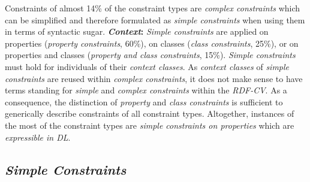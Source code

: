 \documentclass[a4paper,fontsize=11pt]{scrartcl}
\newcommand{\tb}[1]{\todo[size=\small, color=green!40]{\textbf{Thomas:} #1}}
\begin{document}
Constraints of almost 14\% of the constraint types are \emph{complex constraints}
which can be simplified and therefore formulated as \emph{simple constraints} when using them in terms of syntactic sugar.
\textbf{\emph{Context}:}
\emph{Simple constraints} are applied on properties (\emph{property constraints}, 60\%),
on classes (\emph{class constraints}, 25\%), or
on properties and classes (\emph{property and class constraints}, 15\%).
\emph{Simple constraints} must hold for individuals of their \emph{context classes}.
As \emph{context classes} of \emph{simple constraints} are reused within \emph{complex constraints},
it does not make sense to have terms standing for \emph{simple} and \emph{complex constraints} within the \emph{RDF-CV}. 
As a consequence, the distinction of \emph{property} and \emph{class constraints} is sufficient to generically describe constraints of all constraint types.
Altogether, instances of the most of the constraint types are \emph{simple constraints on properties} which are \emph{expressible in DL}. 

\subsection{\emph{Simple Constraints}}
\end{document}
